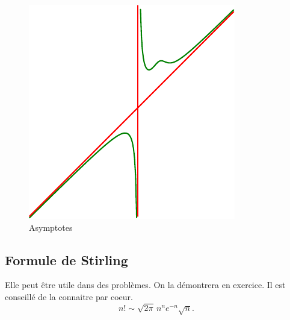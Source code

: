 \begin{figure}[h!]
  \centering
  \includegraphics{C2010_1.pdf}
  \caption{Asymptotes}
  \label{fig:C2010_1}
\end{figure}


\subsection{Formule de Stirling}
 Elle peut être utile dans des problèmes. On la démontrera en exercice. Il est conseillé de la connaitre par coeur.
\begin{displaymath}
  n! \sim \sqrt{2\pi}\, n^n e^{-n} \sqrt{n} .
\end{displaymath}


